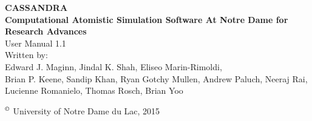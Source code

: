 \begin{center}
\vspace*{2 in}
{\huge{\bf CASSANDRA} }\\ 
\vspace{0.5in}
{\huge { \bf  Computational Atomistic Simulation Software At Notre Dame for Research Advances}} \\
\vspace{1 in}
User Manual 1.1 \\ 
\vspace{0.2in}
Written by: \\ 
\vspace{0.2in}
Edward J. Maginn, Jindal K. Shah, Eliseo Marin-Rimoldi, \\
Brian P. Keene, Sandip Khan, Ryan Gotchy Mullen, Andrew Paluch,
Neeraj Rai, Lucienne Romanielo, Thomas Rosch, Brian Yoo
\end{center}
\vspace{1.3in}
$^\copyright$ University of Notre Dame du Lac, 2015
